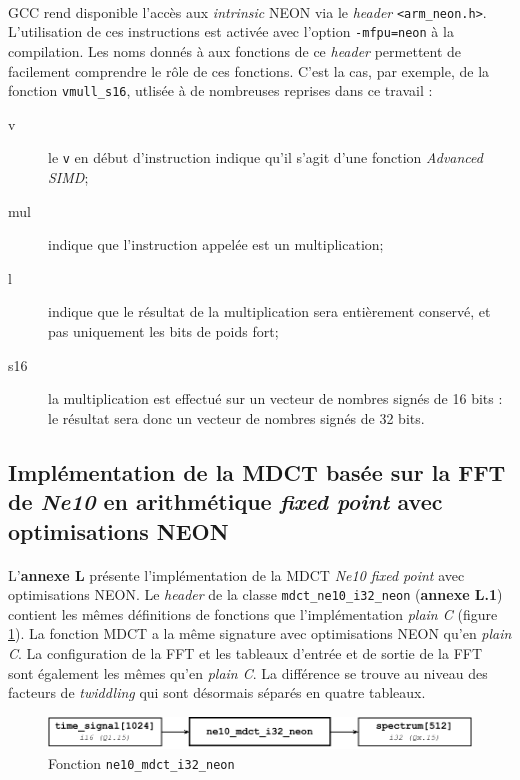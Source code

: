 \documentclass{article}
\begin{document}
    \paragraph{}
    GCC rend disponible l'accès aux \emph{intrinsic} NEON via le \emph{header} \texttt{<arm\_neon.h>}\cite{NEON-list}. L'utilisation de ces instructions est activée avec l'option \texttt{-mfpu=neon} à la compilation. Les noms donnés à aux fonctions de ce \emph{header} permettent de facilement comprendre le rôle de ces fonctions. C'est la cas, par exemple, de la fonction \texttt{vmull\_s16}, utlisée à de nombreuses reprises dans ce travail :
    \begin{description}
        \item[v] le \texttt{v} en début d'instruction indique qu'il s'agit d'une fonction \emph{Advanced SIMD};
        \item[mul] indique que l'instruction appelée est un multiplication;
        \item[l] indique que le résultat de la multiplication sera entièrement conservé, et pas uniquement les bits de poids fort;
        \item[s16] la multiplication est effectué sur un vecteur de nombres signés de 16 bits : le résultat sera donc un vecteur de nombres signés de 32 bits.
    \end{description}


    \subsection{Implémentation de la MDCT basée sur la FFT de \emph{Ne10} en arithmétique \emph{fixed point} avec optimisations NEON}

    \paragraph{}
    L'\textbf{annexe L} présente l'implémentation de la MDCT \emph{Ne10 fixed point} avec optimisations NEON. Le \emph{header} de la classe \texttt{mdct\_ne10\_i32\_neon} (\textbf{annexe L.1}) contient les mêmes définitions de fonctions que l'implémentation \emph{plain C} (figure \ref{fig:func_ne10_mdct_i32_neon}). La fonction MDCT a la même signature avec optimisations NEON qu'en \emph{plain C}. La configuration de la FFT et les tableaux d'entrée et de sortie de la FFT sont également les mêmes qu'en \emph{plain C}. La différence se trouve au niveau des facteurs de \emph{twiddling} qui sont désormais séparés en quatre tableaux.
    \begin{figure}[H]
        \centering
        \includegraphics[width=.8\linewidth]{./images/func_ne10_mdct_i32_neon.pdf}
        \caption{Fonction \texttt{ne10\_mdct\_i32\_neon}}
        \label{fig:func_ne10_mdct_i32_neon}
    \end{figure}
\end{document}
